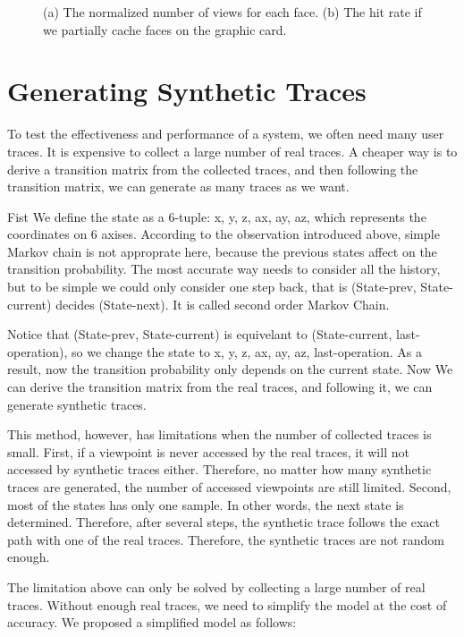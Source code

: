 \begin{figure}[htp!]
\begin{center}
\caption{(a) The normalized number of views for each face. (b) The hit rate if we partially cache faces on the graphic card.\label{fig:heat_map}}
\end{center}
\end{figure}

\section{Generating Synthetic Traces}
To test the effectiveness and performance of a system, we often need many user traces. It is expensive to collect a large number 
of real traces. A cheaper way is to derive a transition matrix from the collected traces, and then following the transition
matrix, we can generate as many traces as we want.

Fist We define the state as a 6-tuple: {x, y, z, ax, ay, az}, which represents the coordinates on 6 axises. 
According to the observation introduced above, simple Markov chain is not approprate here, because
the previous states affect on the transition probability. The most accurate way needs to consider all the
history, but to be simple we could only consider one step back, that is (State-prev, State-current) decides 
(State-next). It is called second order Markov Chain. 

Notice that (State-prev, State-current) is equivelant to (State-current, last-operation), so we change the 
state to {x, y, z, ax, ay, az, last-operation}. As a result, now the transition probability only depends on 
the current state. Now We can derive the transition matrix from the real traces, and following it, we can generate
synthetic traces.

This method, however, has limitations when the number of collected traces is small. First, if a viewpoint is 
never accessed by the real traces, it will not accessed by synthetic traces either. Therefore, no matter how
many synthetic traces are generated, the number of accessed viewpoints are still limited. Second, most of the
states has only one sample. In other words, the next state is determined. Therefore, after several steps, the
synthetic trace follows the exact path with one of the real traces. Therefore, the synthetic traces are not 
random enough.

The limitation above can only be solved by collecting a large number of real traces. Without enough real traces,
we need to simplify the model at the cost of accuracy. We proposed a simplified model as follows:
